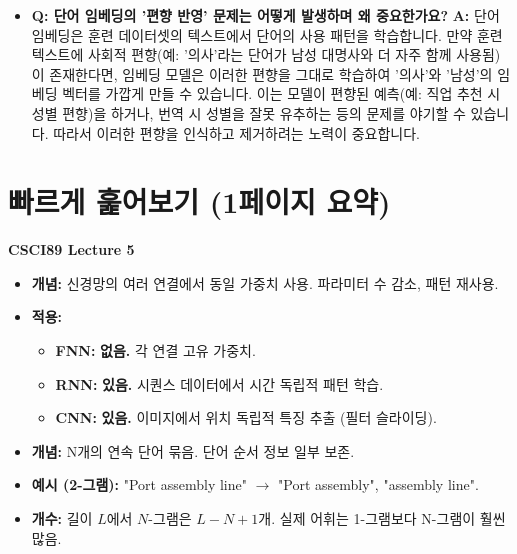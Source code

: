 \documentclass[11pt,a4paper]{article}
\theoremstyle{definition}
\newcommand{\newsection}[1]{\newpage\section{#1}}
\begin{document}
\begin{itemize}
    \item \textbf{Q: 단어 임베딩의 '편향 반영' 문제는 어떻게 발생하며 왜 중요한가요?}
    \textbf{A:} 단어 임베딩은 훈련 데이터셋의 텍스트에서 단어의 사용 패턴을 학습합니다. 만약 훈련 텍스트에 사회적 편향(예: '의사'라는 단어가 남성 대명사와 더 자주 함께 사용됨)이 존재한다면, 임베딩 모델은 이러한 편향을 그대로 학습하여 '의사'와 '남성'의 임베딩 벡터를 가깝게 만들 수 있습니다. 이는 모델이 편향된 예측(예: 직업 추천 시 성별 편향)을 하거나, 번역 시 성별을 잘못 유추하는 등의 문제를 야기할 수 있습니다. 따라서 이러한 편향을 인식하고 제거하려는 노력이 중요합니다.
\end{itemize}

\newsection{빠르게 훑어보기 (1페이지 요약)}

\begin{tcolorbox}[summarybox, title=📝 핵심 개념 요약: 텍스트 처리 및 임베딩]
\textbf{CSCI89 Lecture 5}
\end{tcolorbox}

\begin{tcolorbox}[summarybox, title=1. 가중치 공유 (Weight Sharing)]
\begin{itemize}
    \item \textbf{개념:} 신경망의 여러 연결에서 동일 가중치 사용. 파라미터 수 감소, 패턴 재사용.
    \item \textbf{적용:}
        \begin{itemize}
            \item \textbf{FNN:} \textbf{없음.} 각 연결 고유 가중치.
            \item \textbf{RNN:} \textbf{있음.} 시퀀스 데이터에서 시간 독립적 패턴 학습.
            \item \textbf{CNN:} \textbf{있음.} 이미지에서 위치 독립적 특징 추출 (필터 슬라이딩).
        \end{itemize}
\end{itemize}
\end{tcolorbox}

\begin{tcolorbox}[summarybox, title=2. N-그램 토큰화 (N-gram Tokenization)]
\begin{itemize}
    \item \textbf{개념:} N개의 연속 단어 묶음. 단어 순서 정보 일부 보존.
    \item \textbf{예시 (2-그램):} "Port assembly line" $\rightarrow$ "Port assembly", "assembly line".
    \item \textbf{개수:} 길이 $L$에서 $N$-그램은 $L-N+1$개. 실제 어휘는 1-그램보다 N-그램이 훨씬 많음.
\end{itemize}
\end{tcolorbox}
\end{document}
